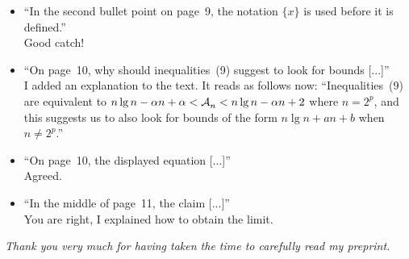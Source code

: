 \documentclass[10pt]{article}
\begin{document}
\begin{itemize}
  \item ``In the second bullet point on page~9, the notation \(\{x\}\)
    is used before it is defined.''\\
    Good catch!

  \item ``On page~10, why should inequalities~(9) suggest to look for
    bounds [...]''\\
    I added an explanation to the text. It reads as follows now:
    ``Inequalities~(9) are equivalent to \(n\lg n - \alpha n + \alpha
    < \mathcal{A}_{n}^{} < n\lg n - \alpha n + 2\) where \(n = 2^p\), and this
    suggests us to also look for bounds of the form \(n\lg n + an +
    b\) when \(n \neq 2^p\).''

  \item ``On page~10, the displayed equation [...]''\\
    Agreed.

  \item ``In the middle of page~11, the claim [...]''\\
    You are right, I explained how to obtain the limit.

\end{itemize}

\emph{Thank you very much for having taken the time to carefully read
  my preprint.}
\end{document}
